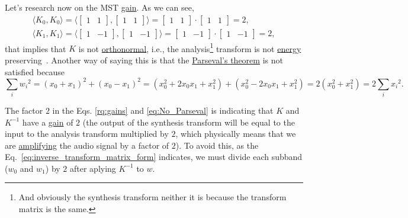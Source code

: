 Let's research now on the MST
\href{https://en.wikipedia.org/wiki/Filter_(signal_processing)}{gain}. As we
can see,
\begin{equation}
\begin{array}{l}
  \langle K_0,K_0 \rangle =
  \langle \begin{bmatrix}
    1 & 1
  \end{bmatrix}
  ,
  \begin{bmatrix}
    1 & 1
  \end{bmatrix}
  \rangle =
  \begin{bmatrix}
    1 & 1
  \end{bmatrix}
  \cdot
  \begin{bmatrix}
    1 & 1
  \end{bmatrix}
   = 2,
   \\
     \langle K_1,K_1 \rangle =
  \langle \begin{bmatrix}
    1 & -1
  \end{bmatrix}
  ,
  \begin{bmatrix}
    1 & -1
  \end{bmatrix}
  \rangle =
  \begin{bmatrix}
    1 & -1
  \end{bmatrix}
  \cdot
  \begin{bmatrix}
    1 & -1
  \end{bmatrix}
   = 2,
\end{array}
\label{eq:gains}
\end{equation}
that implies that $K$ is not
\href{https://en.wikipedia.org/wiki/Orthonormality}{orthonormal},
i.e., the analysis\footnote{And obviously the synthesis transform
  neither it is because the transform matrix is the same.} transform
is not
\href{https://en.wikipedia.org/wiki/Energy_(signal_processing)}{energy}
preserving~\cite{sayood2017introduction}. Another way of saying this
is that the
\href{https://en.wikipedia.org/wiki/Parseval%27s_theorem}{Parseval's theorem}
  is not satisfied because
\begin{equation}
  \sum_i {w_i}^2 =
  (x_0+x_1)^2 + (x_0-x_1)^2 =
  (x_0^2+2x_0x_1+x_1^2) + (x_0^2-2x_0x_1+x_1^2) =
  2(x_0^2+x_1^2) =
  2\sum_i {x_i}^2.
  \label{eq:No_Parseval}
\end{equation}

The factor $2$ in the Eqs. \ref{rq:gains} and \ref{eq:No_Parseval} is
indicating that $K$ and $K^{-1}$ have a
\href{https://en.wikipedia.org/wiki/Gain_(electronics)}{gain} of $2$
(the output of the synthesis transform will be equal to the input to
the analysis transform multiplied by $2$, which physically means that
we are \href{https://en.wikipedia.org/wiki/Amplifier}{amplifying} the
audio signal by a factor of $2$). To avoid this, as the
Eq.~\ref{eq:inverse_transform_matrix_form} indicates, we must divide
each subband ($w_0$ and $w_1$) by $2$ after aplying $K^{-1}$ to $w$.

